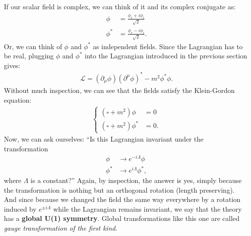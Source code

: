 \documentclass{book}
\numberwithin{equation}{section}
\theoremstyle{definition}
\newcommand{\p}{\partial}
\newcommand{\lag}{\mathcal{L}}
\begin{document}
If our scalar field is complex, we can think of it and its complex conjugate as:
\begin{align}
\phi &= \frac{\phi_r + i\phi_i}{\sqrt{2}}\\
\phi^* &= \frac{\phi_r - i\phi_i}{\sqrt{2}}.
\end{align}
Or, we can think of $\phi$ and $\phi^*$ as independent fields. Since the Lagrangian has to be real, plugging $\phi$ and $\phi^*$ into the Lagrangian introduced in the previous section gives:
\begin{align}
\lag = (\p_\mu \phi)(\p^\mu \phi)^* - m^2\phi^*\phi.
\end{align}
Without much inspection, we can see that the fields satisfy the Klein-Gordon equation:
\begin{align}
\begin{cases}
(\square + m^2)\phi &= 0\\
(\square + m^2)\phi^* &= 0.
\end{cases}
\end{align}
Now, we can ask ourselves: ``Is this Lagrangian invariant under the transformation
\begin{align}
\phi &\to e^{-i\Lambda}\phi\\
\phi^* &\to e^{i\Lambda}\phi^*,
\end{align}
where $\Lambda$ is a constant?'' Again, by inspection, the answer is yes, simply because the transformation is nothing but an orthogonal rotation (length preserving). And since because we changed the field the same way everywhere by a rotation induced by $e^{\pm i\Lambda}$ while the Lagrangian remains invariant, we say that the theory has a \textbf{global U(1) symmetry}. Global transformations like this one are called \textit{gauge transformation of the first kind}.
\end{document}
